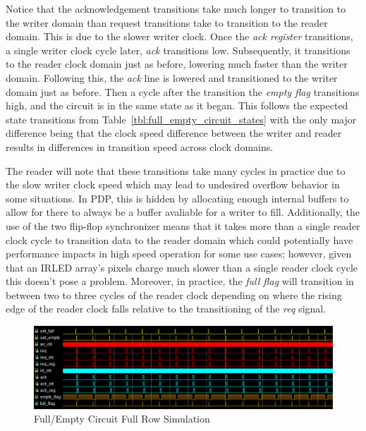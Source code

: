 Notice that the acknowledgement transitions take much longer to transition to the writer domain than request transitions take to transition to the reader domain. This is due to the slower writer clock. Once the {\it ack register} transitions, a single writer clock cycle later, {\it ack} transitions low. Subsequently, it transitions to the reader clock domain just as before, lowering much faster than the writer domain. Following this, the {\it ack} line is lowered and transitioned to the writer domain just as before. Then a cycle after the transition the {\it empty flag} transitions high, and the circuit is in the same state as it began. This follows the expected state transitions from Table~\ref{tbl:full_empty_circuit_states} with the only major difference being that the clock speed difference between the writer and reader results in differences in transition speed across clock domains.

The reader will note that these transitions take many cycles in practice due to the slow writer clock speed which may lead to undesired overflow behavior in some situations. In PDP, this is hidden by allocating enough internal buffers to allow for there to always be a buffer avaliable for a writer to fill. Additionally, the use of the two flip-flop synchronizer means that it takes more than a single reader clock cycle to transition data to the reader domain which could potentially have performance impacts in high speed operation for some use cases; however, given that an IRLED array's pixels charge much slower than a single reader clock cycle this doesn't pose a problem. Moreover, in practice, the {\it full flag} will transition in between two to three cycles of the reader clock depending on where the rising edge of the reader clock falls relative to the transitioning of the {\it req} signal.

\begin{figure}
    \centering
    \includegraphics[width=1.0\textwidth]{fig/full_empty_row_sim.png}
    \caption{Full/Empty Circuit Full Row Simulation}
    \label{fig:full_empty_row_sim}
\end{figure}

